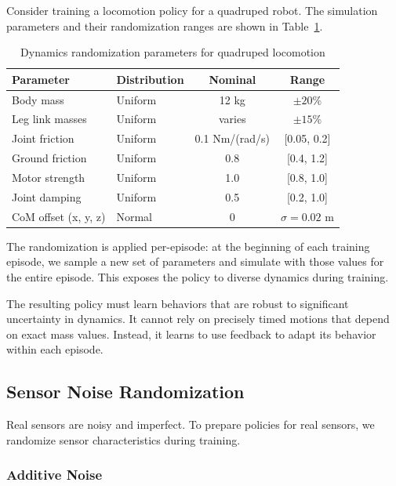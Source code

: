 \begin{example}
\label{ex:quadruped_dynamics_rand}
Consider training a locomotion policy for a quadruped robot. The simulation parameters and their randomization ranges are shown in Table~\ref{tab:quadruped_randomization}.

\begin{table}[htbp]
\centering
\caption{Dynamics randomization parameters for quadruped locomotion}
\label{tab:quadruped_randomization}
\begin{tabular}{llcc}
\toprule
\textbf{Parameter} & \textbf{Distribution} & \textbf{Nominal} & \textbf{Range} \\
\midrule
Body mass & Uniform & 12 kg & $\pm 20\%$ \\
Leg link masses & Uniform & varies & $\pm 15\%$ \\
Joint friction & Uniform & 0.1 Nm/(rad/s) & [0.05, 0.2] \\
Ground friction & Uniform & 0.8 & [0.4, 1.2] \\
Motor strength & Uniform & 1.0 & [0.8, 1.0] \\
Joint damping & Uniform & 0.5 & [0.2, 1.0] \\
CoM offset (x, y, z) & Normal & 0 & $\sigma = 0.02$ m \\
\bottomrule
\end{tabular}
\end{table}

The randomization is applied per-episode: at the beginning of each training episode, we sample a new set of parameters and simulate with those values for the entire episode. This exposes the policy to diverse dynamics during training.

The resulting policy must learn behaviors that are robust to significant uncertainty in dynamics. It cannot rely on precisely timed motions that depend on exact mass values. Instead, it learns to use feedback to adapt its behavior within each episode.
\end{example}

\subsection{Sensor Noise Randomization}

Real sensors are noisy and imperfect. To prepare policies for real sensors, we randomize sensor characteristics during training.

\subsubsection{Additive Noise}

